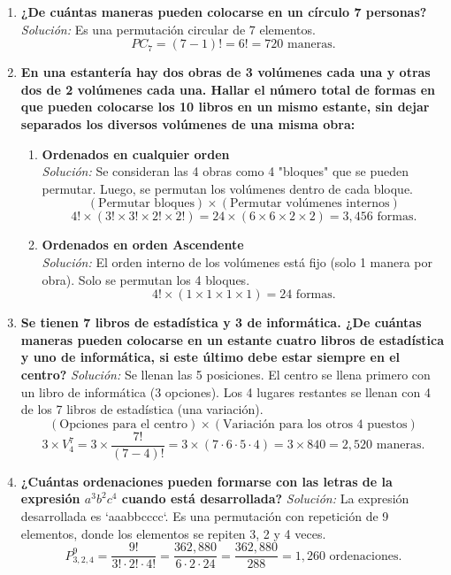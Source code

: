 \documentclass[12pt, letterpaper]{article}
\begin{document}
\begin{enumerate}
	\item \textbf{¿De cuántas maneras pueden colocarse en un círculo 7 personas?}
	      \textit{Solución:} Es una permutación circular de 7 elementos.
	      \[ PC_7 = (7-1)! = 6! = 720 \text{ maneras.} \]

	\item \textbf{En una estantería hay dos obras de 3 volúmenes cada una y otras dos de 2 volúmenes cada una. Hallar el número total de formas en que pueden colocarse los 10 libros en un mismo estante, sin dejar separados los diversos volúmenes de una misma obra:}
	      \begin{enumerate}
		      \item \textbf{Ordenados en cualquier orden} \\
		            \textit{Solución:} Se consideran las 4 obras como 4 "bloques" que se pueden permutar. Luego, se permutan los volúmenes dentro de cada bloque.
		            \[ (\text{Permutar bloques}) \times (\text{Permutar volúmenes internos}) \]
		            \[ 4! \times (3! \times 3! \times 2! \times 2!) = 24 \times (6 \times 6 \times 2 \times 2) = 3,456 \text{ formas.} \]
		      \item \textbf{Ordenados en orden Ascendente} \\
		            \textit{Solución:} El orden interno de los volúmenes está fijo (solo 1 manera por obra). Solo se permutan los 4 bloques.
		            \[ 4! \times (1 \times 1 \times 1 \times 1) = 24 \text{ formas.} \]
	      \end{enumerate}

	\item \textbf{Se tienen 7 libros de estadística y 3 de informática. ¿De cuántas maneras pueden colocarse en un estante cuatro libros de estadística y uno de informática, si este último debe estar siempre en el centro?}
	      \textit{Solución:} Se llenan las 5 posiciones. El centro se llena primero con un libro de informática (3 opciones). Los 4 lugares restantes se llenan con 4 de los 7 libros de estadística (una variación).
	      \[ (\text{Opciones para el centro}) \times (\text{Variación para los otros 4 puestos}) \]
	      \[ 3 \times V_4^7 = 3 \times \frac{7!}{(7-4)!} = 3 \times (7 \cdot 6 \cdot 5 \cdot 4) = 3 \times 840 = 2,520 \text{ maneras.} \]

	\item \textbf{¿Cuántas ordenaciones pueden formarse con las letras de la expresión \texorpdfstring{$a^3b^2c^4$}{a3b2c4} cuando está desarrollada?}
	      \textit{Solución:} La expresión desarrollada es `aaabbcccc`. Es una permutación con repetición de 9 elementos, donde los elementos se repiten 3, 2 y 4 veces.
	      \[ P_{3,2,4}^{9} = \frac{9!}{3! \cdot 2! \cdot 4!} = \frac{362,880}{6 \cdot 2 \cdot 24} = \frac{362,880}{288} = 1,260 \text{ ordenaciones.} \]
\end{enumerate}
\newpage
\end{document}
